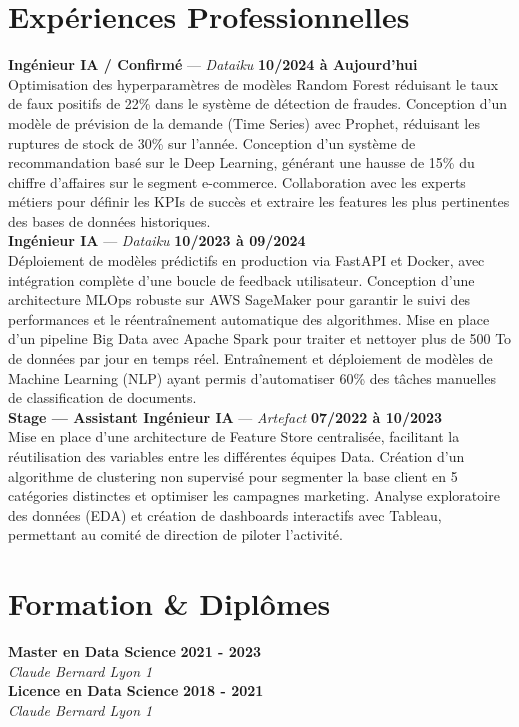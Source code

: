 \documentclass[11pt,a4paper]{article}
\begin{document}
\section*{Expériences Professionnelles}
\noindent \textbf{Ingénieur IA / Confirmé} --- \textit{Dataiku} \hfill \textbf{10/2024 à Aujourd'hui} \\
Optimisation des hyperparamètres de modèles Random Forest réduisant le taux de faux positifs de 22\% dans le système de détection de fraudes. Conception d'un modèle de prévision de la demande (Time Series) avec Prophet, réduisant les ruptures de stock de 30\% sur l'année. Conception d'un système de recommandation basé sur le Deep Learning, générant une hausse de 15\% du chiffre d'affaires sur le segment e-commerce. Collaboration avec les experts métiers pour définir les KPIs de succès et extraire les features les plus pertinentes des bases de données historiques. \\[0.3cm]
\noindent \textbf{Ingénieur IA} --- \textit{Dataiku} \hfill \textbf{10/2023 à 09/2024} \\
Déploiement de modèles prédictifs en production via FastAPI et Docker, avec intégration complète d'une boucle de feedback utilisateur. Conception d'une architecture MLOps robuste sur AWS SageMaker pour garantir le suivi des performances et le réentraînement automatique des algorithmes. Mise en place d'un pipeline Big Data avec Apache Spark pour traiter et nettoyer plus de 500 To de données par jour en temps réel. Entraînement et déploiement de modèles de Machine Learning (NLP) ayant permis d'automatiser 60\% des tâches manuelles de classification de documents. \\[0.3cm]
\noindent \textbf{Stage — Assistant Ingénieur IA} --- \textit{Artefact} \hfill \textbf{07/2022 à 10/2023} \\
Mise en place d'une architecture de Feature Store centralisée, facilitant la réutilisation des variables entre les différentes équipes Data. Création d'un algorithme de clustering non supervisé pour segmenter la base client en 5 catégories distinctes et optimiser les campagnes marketing. Analyse exploratoire des données (EDA) et création de dashboards interactifs avec Tableau, permettant au comité de direction de piloter l'activité. \\[0.3cm]


\vspace{0.3cm}

\section*{Formation \& Diplômes}
\noindent \textbf{Master en Data Science} \hfill \textbf{2021 - 2023} \\
\textit{Claude Bernard Lyon 1} \\[0.3cm]
\noindent \textbf{Licence en Data Science} \hfill \textbf{2018 - 2021} \\
\textit{Claude Bernard Lyon 1} \\[0.3cm]
\end{document}
